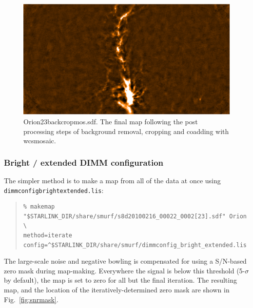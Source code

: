 \documentclass[twoside,11pt]{article}
\newcommand{\xlabel}[1]{}
\renewcommand{\_}{\texttt{\symbol{95}}}
\newenvironment{myquote}{\begin{quote}\begin{small}}{\end{small}\end{quote}}
\begin{document}
\begin{figure}
\begin{center}
\includegraphics[width=\linewidth]{sc19_map22+23_back_crop_wcsmos.eps}
\caption{Orion23\_back\_crop\_mos.sdf. The final map following the
  post processing steps of background removal, cropping and coadding
  with wcsmosaic.}
\label{fig:orionmosaic}
\end{center}
\end{figure}

\subsubsection{\xlabel{galacticextended}Bright / extended DIMM configuration}

The simpler method is to make a map from all of the data at once using
\texttt{dimmconfig\_bright\_extended.lis}:

\begin{myquote}
\begin{verbatim}
% makemap "$STARLINK_DIR/share/smurf/s8d20100216_00022_0002[23].sdf" Orion \
method=iterate config=^$STARLINK_DIR/share/smurf/dimmconfig_bright_extended.lis
\end{verbatim}
\end{myquote}

The large-scale noise and negative bowling is compensated for using a
S/N-based zero mask during map-making. Everywhere the signal is below
this threshold (5-$\sigma$ by default), the map is set to zero for all
but the final iteration. The resulting map, and the location of the
iteratively-determined zero mask are shown in Fig.~\ref{fig:snrmask}.
\end{document}
